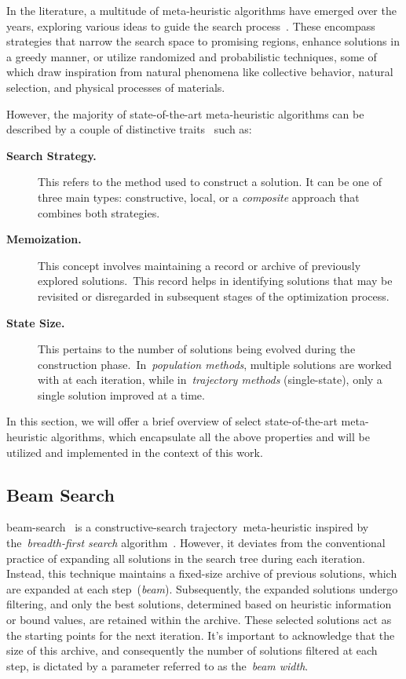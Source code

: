 In the literature, a multitude of meta-heuristic algorithms have emerged over
the years, exploring various ideas to guide the search
process~\cite{osman1996metaheuristics}. These encompass strategies that narrow
the search space to promising regions, enhance solutions in a greedy manner, or
utilize randomized and probabilistic techniques, some of which draw inspiration
from natural phenomena like collective behavior, natural selection, and physical
processes of materials.

However, the majority of state-of-the-art meta-heuristic algorithms can be
described by a couple of distinctive traits~\cite{blum2003metaheuristics} such as:

\begin{description}
  \item[\textbf{Search Strategy.}] This refers to the method used to construct a
    solution. It can be one of three main types: constructive, local, or a
    \emph{composite} approach that combines both strategies.

  \item[\textbf{Memoization.}] This concept involves maintaining a record or
    archive of previously explored solutions.~This record helps in identifying
    solutions that may be revisited or disregarded in subsequent stages of the
    optimization process.

  \item[\textbf{State Size.}] This pertains to the number of solutions being
    evolved during the construction phase.~In~\emph{population methods}, multiple
    solutions are worked with at each iteration, while in~\emph{trajectory methods} (single-state),
    only a single solution improved at a time.
\end{description}

In this section, we will offer a brief overview of select state-of-the-art
\acrshort{meta-heuristic} algorithms, which encapsulate all the above properties
and will be utilized and implemented in the context of this work.

\subsection{Beam Search}
\label{subsec:beam-search}

\acrfull{beam-search}~\cite{ow1988filtered,outeiro2021application} is a
\acrshort{constructive-search} trajectory~\acrfull{meta-heuristic} inspired by
the~\emph{breadth-first search} algorithm~\cite{papadimitriou1998combinatorial}.
However, it deviates from the conventional practice of expanding all solutions
in the search tree during each iteration. Instead, this technique maintains a
fixed-size archive of previous solutions, which are expanded at each
step~(\textit{beam}). Subsequently, the expanded solutions undergo filtering,
and only the best solutions, determined based on heuristic information or bound
values, are retained within the archive. These selected solutions act as the
starting points for the next iteration. It's important to acknowledge that the
size of this archive, and consequently the number of solutions filtered at each
step, is dictated by a parameter referred to as the~\emph{beam width}.


